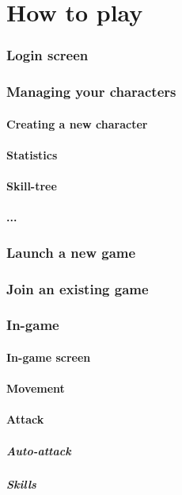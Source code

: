 \documentclass{scrreprt}
\begin{document}
\part{How to play}
\section{Login screen}
\section{Managing your characters}
\subsection{Creating a new character}
\subsection{Statistics}
\subsection{Skill-tree}
\subsection{...}
\section{Launch a new game}
\section{Join an existing game}
\section{In-game}
\subsection{In-game screen}
\subsection{Movement}
\subsection{Attack}
\subsubsection{Auto-attack}
\subsubsection{Skills}
\end{document}

